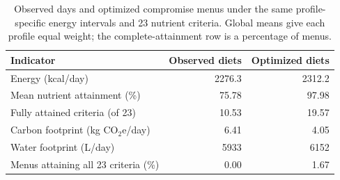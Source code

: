 \begin{table}[pos=h]
\centering\small
\caption{Observed days and optimized compromise menus under the same profile-specific energy intervals and 23 nutrient criteria. Global means give each profile equal weight; the complete-attainment row is a percentage of menus.}
\label{tab:observed-comparison}
\begin{tabularx}{\textwidth}{Xrr}
\toprule
Indicator & Observed diets & Optimized diets \\
\midrule
Energy (kcal/day) & 2276.3 & 2312.2 \\
\midrule
Mean nutrient attainment (\%) & 75.78 & 97.98 \\
\midrule
Fully attained criteria (of 23) & 10.53 & 19.57 \\
\midrule
Carbon footprint (kg CO$_2$e/day) & 6.41 & 4.05 \\
\midrule
Water footprint (L/day) & 5933 & 6152 \\
\midrule
Menus attaining all 23 criteria (\%) & 0.00 & 1.67 \\
\bottomrule
\end{tabularx}
\end{table}
